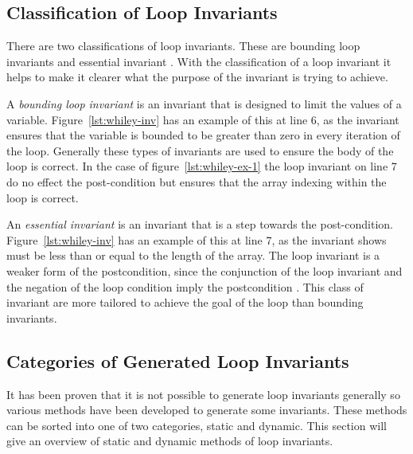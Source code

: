 \subsection{Classification of Loop Invariants}

There are two classifications of loop invariants.
These are bounding loop invariants and essential invariant
\cite{invarints-classifiction}.
With the classification of a loop invariant it helps to make
it clearer what the purpose of the invariant is trying to achieve.

A \textit{bounding loop invariant} is an invariant that is designed
to limit the values of a variable.
Figure~\ref{lst:whiley-inv} has an example of this at line 6, as the invariant
ensures that the variable  is bounded to be greater than zero
in every iteration of the loop.
Generally these types of invariants are used to ensure the body of the loop
is correct. In the case of figure~\ref{lst:whiley-ex-1} the loop invariant on line
7 do no effect the post-condition but ensures that the array indexing within
the loop is correct.

An \textit{essential invariant} is an invariant that is a step towards the
post-condition.
Figure~\ref{lst:whiley-inv} has an example of this at line 7,
as the invariant shows  must be less than or
equal to the length of the  array.
The loop invariant is a weaker form of the postcondition,
since the conjunction of the loop invariant and the negation
of the loop condition imply the postcondition \cite{invarints-classifiction}.
This class of invariant are more tailored to achieve
the goal of the loop than bounding invariants.

\subsection{Categories of Generated Loop Invariants}

It has been proven that it is not possible to generate loop invariants
generally %
so various methods have been developed to generate some invariants.
These methods can be sorted into one of two categories, static and dynamic.
This section will give an overview of static and dynamic methods of loop
invariants.

